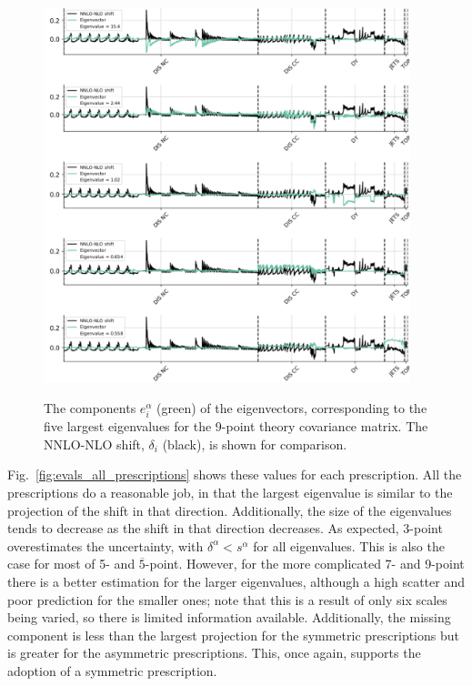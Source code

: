 \begin{figure}[H]
  \begin{center}
    \includegraphics[width=0.95\textwidth]{mhous/plots/eigenvector_plot_10.pdf}\\
    \caption{\small The components  $e^\alpha_i$ (green) of the eigenvectors, corresponding
      to the five largest eigenvalues for the 9-point theory covariance matrix. The NNLO-NLO shift, $\delta_i$ (black), is shown for comparison.
    \label{fig:evecs1} }
  \end{center}
\end{figure}
Fig.~\ref{fig:evals_all_prescriptions} shows these values for each prescription. All the prescriptions do a reasonable job, in that the largest eigenvalue is similar to the projection of the shift in that direction. Additionally, the size of the eigenvalues tends to decrease as the shift in that direction decreases. As expected, 3-point overestimates the uncertainty, with $\delta^\alpha < s^\alpha$ for all eigenvalues. This is also the case for most of 5- and $\overline{5}$-point. However, for the more complicated 7- and 9-point there is a better estimation for the larger eigenvalues, although a high scatter and poor prediction for the smaller ones; note that this is a result of only six scales being varied, so there is limited information available. Additionally, the missing component is less than the largest projection for the symmetric prescriptions but is greater for the asymmetric prescriptions. This, once again, supports the adoption of a symmetric prescription.

